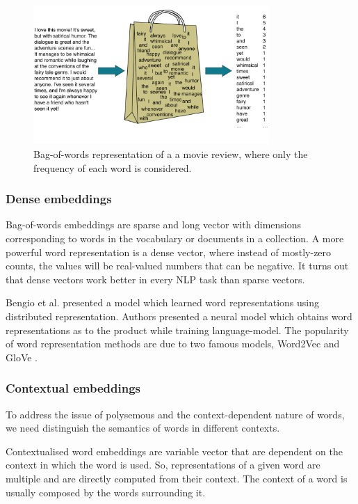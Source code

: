 \begin{figure}[H]
    \centering
    \includegraphics[width=0.8\textwidth]{images/2_1_bag_of_words.png}
    \caption{Bag-of-words representation of a a movie review, where only the frequency of each word is considered.}\label{fig:bag_of_words}
\end{figure}


\subsubsection{Dense embeddings}\label{subsubsec:static-embeddings}
Bag-of-words embeddings are sparse and long vector with dimensions corresponding to words in the vocabulary or documents in a collection.
A more powerful word representation is a dense vector, where instead of mostly-zero counts, the values will be real-valued numbers that can be negative.
It turns out that dense vectors work better in every NLP task than sparse vectors.

Bengio et al. \cite{conf/nips/BengioDV00} presented a model which learned word representations using distributed
representation. Authors presented a neural model which obtains word representations as to
the product while training \gls{language-model}.
The popularity of word representation methods are due to two famous models, Word2Vec
\cite{mikolov2013efficient} and GloVe \cite{pennington2014glove}.

\subsubsection{Contextual embeddings}\label{subsubsec:contextual-embeddings}
To address the issue of polysemous and the context-dependent nature of words, we need
distinguish the semantics of words in different contexts.

Contextualised word embeddings are variable vector that are dependent on the context in which the word is used.
So, representations of a given word are multiple and are
directly computed from their context. The context of a
word is usually composed by the words surrounding it.

